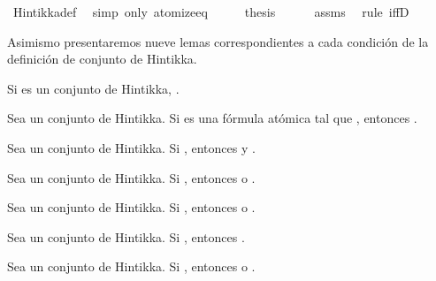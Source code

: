 \begin{isabellebody}
\ Hintikka{\isacharunderscore}def\ \isamarkupfalse%
\ {\isacharparenleft}simp\ only{\isacharcolon}\ atomize{\isacharunderscore}eq{\isacharparenright}\isanewline
\ \ \isamarkupfalse%
\ \isamarkupfalse%
\ {\isacharquery}thesis\isanewline
\ \ \ \ \isamarkupfalse%
\ assms\ \isamarkupfalse%
\ {\isacharparenleft}rule\ iffD{}{\isacharparenright}\isanewline
{}\isamarkupfalse%
%
\endisatagproof
{\isafoldproof}%
%
\isadelimproof
%
\endisadelimproof
%
\begin{isamarkuptext}%
Asimismo presentaremos nueve lemas correspondientes a cada
  condición de la definición de conjunto de Hintikka. 

  \begin{lema}
    Si  es un conjunto de Hintikka, .
  \end{lema}

  \begin{lema}
    Sea  un conjunto de Hintikka. Si  es una fórmula atómica tal 
    que , entonces .
  \end{lema}

  \begin{lema}
    Sea  un conjunto de Hintikka. Si , entonces 
     y .
  \end{lema}

  \begin{lema}
    Sea  un conjunto de Hintikka. Si , entonces 
     o .
  \end{lema}

  \begin{lema}
    Sea  un conjunto de Hintikka. Si , entonces 
     o .
  \end{lema}

  \begin{lema}
    Sea  un conjunto de Hintikka. Si , entonces .
  \end{lema}

  \begin{lema}
    Sea  un conjunto de Hintikka. Si , entonces 
     o .
  \end{lema}


\end{isamarkuptext}
\end{isabellebody}
